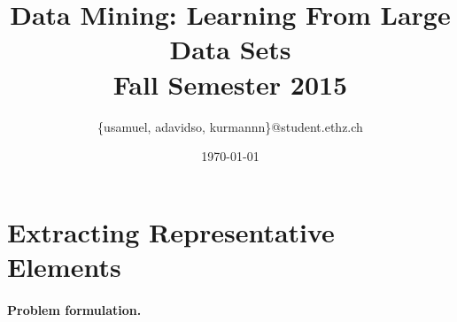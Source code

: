 \documentclass[a4paper, 11pt]{article}
\title{Data Mining: Learning From Large Data Sets\\\vspace{2mm}\Large{Fall Semester 2015}}
\author{\{usamuel, adavidso, kurmannn\}@student.ethz.ch}
\date{\today}
\begin{document}
\maketitle
\thispagestyle{empty}
\pagestyle{empty}

\section*{Extracting Representative Elements} 


\paragraph{Problem formulation.\!\!\!}



\end{document}
